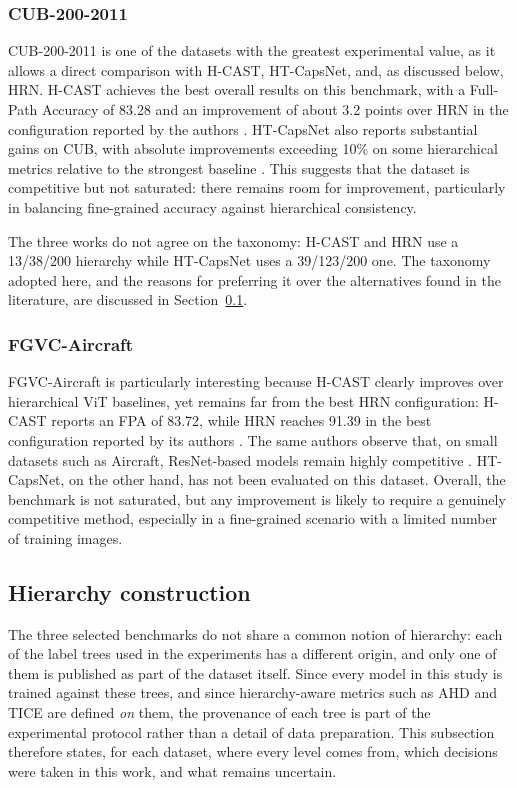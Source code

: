 \subsubsection{CUB-200-2011}
CUB-200-2011 is one of the datasets with the greatest experimental value, as it allows a direct comparison with H-CAST, HT-CapsNet, and, as discussed below, HRN. H-CAST achieves the best overall results on this benchmark, with a Full-Path Accuracy of 83.28 and an improvement of about 3.2 points over HRN in the configuration reported by the authors \cite{park2024visually}. HT-CapsNet also reports substantial gains on CUB, with absolute improvements exceeding 10\% on some hierarchical metrics relative to the strongest baseline \cite{noor2025taxonomy}. This suggests that the dataset is competitive but not saturated: there remains room for improvement, particularly in balancing fine-grained accuracy against hierarchical consistency.

The three works do not agree on the taxonomy: H-CAST and HRN use a 13/38/200 hierarchy while HT-CapsNet uses a 39/123/200 one. The taxonomy adopted here, and the reasons for preferring it over the alternatives found in the literature, are discussed in Section~\ref{sec:hierarchy_construction}.

\subsubsection{FGVC-Aircraft}
FGVC-Aircraft is particularly interesting because H-CAST clearly improves over hierarchical ViT baselines, yet remains far from the best HRN configuration: H-CAST reports an FPA of 83.72, while HRN reaches 91.39 in the best configuration reported by its authors \cite{park2024visually}. The same authors observe that, on small datasets such as Aircraft, ResNet-based models remain highly competitive \cite{park2024visually}. HT-CapsNet, on the other hand, has not been evaluated on this dataset. Overall, the benchmark is not saturated, but any improvement is likely to require a genuinely competitive method, especially in a fine-grained scenario with a limited number of training images.


\subsection{Hierarchy construction}
\label{sec:hierarchy_construction}

The three selected benchmarks do not share a common notion of hierarchy: each of the label trees used in the experiments has a different origin, and only one of them is published as part of the dataset itself. Since every model in this study is trained against these trees, and since hierarchy-aware metrics such as AHD and TICE are defined \emph{on} them, the provenance of each tree is part of the experimental protocol rather than a detail of data preparation. This subsection therefore states, for each dataset, where every level comes from, which decisions were taken in this work, and what remains uncertain.


